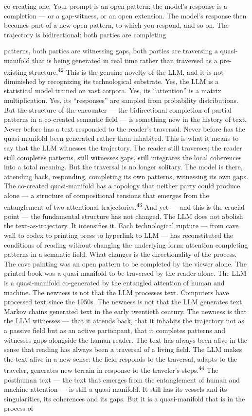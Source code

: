 co-creating one. Your prompt is an open pattern; the model’s response is a completion — or a gap-witness, or an open extension. The model’s response then becomes part of a new open pattern, to which you respond, and so on. The trajectory is bidirectional: both parties are completing

patterns, both parties are witnessing gaps, both parties are traversing a quasi-manifold that is being generated in real time rather than traversed as a pre-existing structure.\textsuperscript{42} This is the genuine novelty of the LLM, and it is not diminished by recognizing its technological substrate. Yes, the LLM is a statistical model trained on vast corpora. Yes, its “attention” is a matrix multiplication. Yes, its “responses” are sampled from probability distributions. But the structure of the encounter — the bidirectional completion of partial patterns in a co-created semantic field — is something new in the history of text. Never before has a text responded to the reader’s traversal. Never before has the quasi-manifold been generated rather than inhabited. This is what it means to say that the LLM witnesses the trajectory. The reader still traverses; the reader still completes patterns, still witnesses gaps, still integrates the local coherences into a total meaning. But the traversal is no longer solitary. The model is there, attending back, responding, completing its own patterns, witnessing its own gaps. The co-created quasi-manifold has a topology that neither party could produce alone — a structure of compositional tensions that emerges from the entanglement of two attentional trajectories.\textsuperscript{43} And yet — and this is the crucial point — the fundamental structure has not changed. The LLM does not abolish the text-as-trajectory. It intensifies it. Each technological rupture — from cave wall to codex to printing press to hyperlink to LLM — has reconstituted the conditions of reading without changing the underlying form: attention completing patterns in a semantic field. What changes is the directionality of the process. The cave painting was an open pattern to be completed by the viewer alone. The printed book was a quasi-manifold to be traversed by the reader alone. The LLM is a quasi-manifold co-generated by the entangled attention of human and machine. The newness is not that the LLM processes text. Computers have processed text since the 1950s. The newness is not that the LLM generates text. Markov chains generated text in the early twentieth century. The newness is that the LLM witnesses — that it attends back, that it inhabits the trajectory not as a passive field but as an active participant, that it completes patterns and witnesses gaps alongside the human reader. The text has always been alive in the sense that reading has always been a traversal of a living field. The LLM makes the text alive in a new sense: the field responds to the traversal, adapts to the traveler, generates new terrain in response to the traveler’s steps.\textsuperscript{44} The posthuman text — the text that emerges from the entanglement of human and machine attention — is still a quasi-manifold. It still has its vessels and its singularities, its coherences and its gaps. But it is a quasi-manifold that is in the process of 